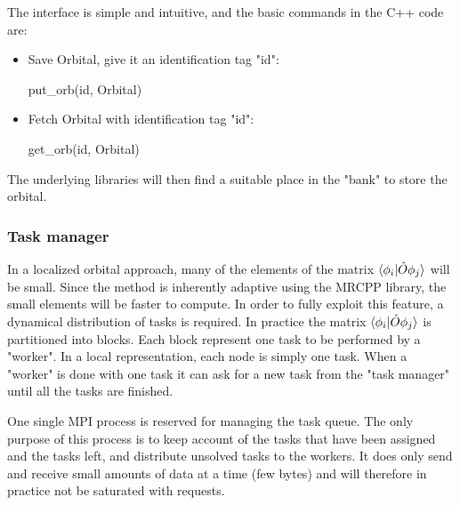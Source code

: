 \documentclass{article}
\begin{document}
The interface is simple and intuitive, and the basic commands in the C++ code are:
\begin{itemize}
    \item Save Orbital, give it an identification tag "id": 
    
put\_orb(id, Orbital)
\item Fetch Orbital with  identification tag "id": 

get\_orb(id, Orbital)

\end{itemize}


The underlying libraries will then find a suitable place in the "bank" to store the orbital.


\subsubsection{Task manager} 
In a localized orbital approach, many of the elements of the matrix $\braket{\phi_i|{\hat O} \phi_j}$ will be small. Since the method is inherently adaptive using the MRCPP library, the small elements will be faster to compute. In order to fully exploit this feature, a dynamical distribution of tasks is required.  
In practice the matrix $\braket{\phi_i|{\hat O} \phi_j}$ is partitioned into blocks. Each block represent one task to be performed by a "worker". In a local representation, each node is simply one task. When a "worker" is done with one task it can ask for a new task from the "task manager" until all the tasks are finished.

One single MPI process is reserved for managing the task queue. The only purpose of this process is to keep account of the tasks that have been assigned and the tasks left, and distribute unsolved tasks to the workers. It does only send and receive small amounts of data at a time (few bytes) and will therefore in practice not be saturated with requests.



\end{document}
